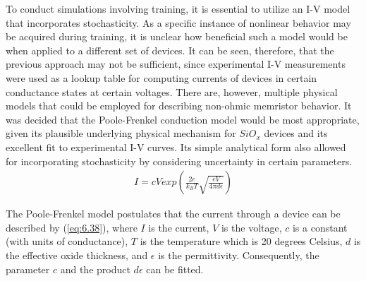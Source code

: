

\noindent To conduct simulations involving training, it is essential to utilize an I-V model that incorporates stochasticity. As a specific instance of nonlinear behavior may be acquired during training, it is unclear how beneficial such a model would be when applied to a different set of devices. It can be seen, therefore, that the previous approach may not be sufficient, since experimental I-V measurements were used as a lookup table for computing currents of devices in certain conductance states at certain voltages. There are, however, multiple physical models that could be employed for describing non-ohmic memristor behavior. It was decided that the Poole-Frenkel conduction model \cite{joksas2022nonideality} would be most appropriate, given its plausible underlying physical mechanism for $SiO_x$  devices and its excellent fit to experimental I-V curves. Its simple analytical form also allowed for incorporating stochasticity by considering uncertainty in certain parameters.
\begin{align}
I = cV exp\left( \frac{2e}{k_BT} \sqrt{\frac{eV}{4\pi d\epsilon}} \right) \label{eq:6.38}
\end{align}

\noindent The Poole-Frenkel model postulates that the current through a device can be described by (\ref{eq:6.38}), where $I$ is the current, $V$ is the voltage, $c$ is a constant (with units of conductance), $T$ is the temperature which is 20 degrees Celsius, $d$ is the effective oxide thickness, and $\epsilon$ is the permittivity. Consequently, the parameter $c$ and the product $d\epsilon$ can be fitted.\\

